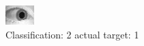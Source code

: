 \begin{figure}[h!]
\begin{center}
\includegraphics[width=0.60\columnwidth]{figures/ID1547_class_2_target_1.png}
\end{center}
\caption{ Classification: 2 actual target: 1}
\label{fig:ID1547_class_2_target_1}
\end{figure}
